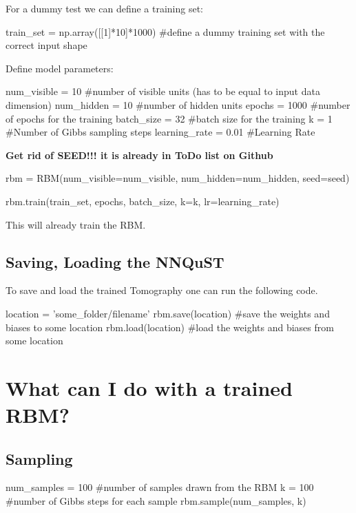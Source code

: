 \documentclass[a4paper]{article}
\begin{document}
For a dummy test we can define a training set:

\begin{python}
train_set = np.array([[1]*10]*1000) #define a dummy training set with the correct input shape
\end{python}

Define model parameters:

\begin{python}
num_visible = 10 #number of visible units (has to be equal to input data dimension)
num_hidden = 10 #number of hidden units
epochs = 1000 #number of epochs for the training
batch_size = 32 #batch size for the training
k = 1 #Number of Gibbs sampling steps
learning_rate = 0.01 #Learning Rate
\end{python}

\textbf{Get rid of SEED!!! it is already in ToDo list on Github}

\begin{python}
rbm = RBM(num_visible=num_visible, num_hidden=num_hidden, seed=seed)

rbm.train(train_set, epochs, batch_size, k=k, lr=learning_rate)
\end{python}

This will already train the RBM.

\subsection{Saving, Loading the NNQuST}

To save and load the trained Tomography one can run the following code.

\begin{python}
location = 'some_folder/filename'
rbm.save(location) #save the weights and biases to some location
rbm.load(location) #load the weights and biases from some location
\end{python}

\section{What can I do with a trained RBM?}

\subsection{Sampling}

\begin{python}
num_samples = 100 #number of samples drawn from the RBM
k = 100 #number of Gibbs steps for each sample
rbm.sample(num_samples, k)
\end{python}
\end{document}
